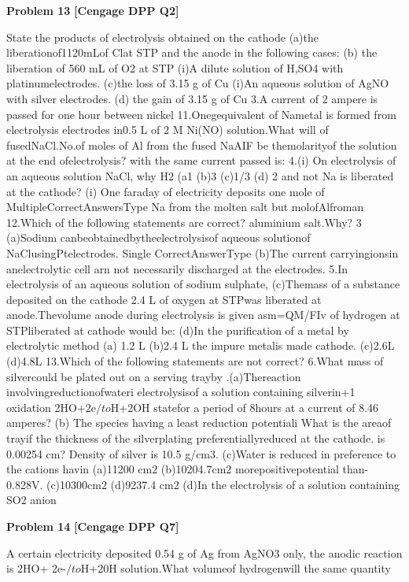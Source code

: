 \begin{problembox}
\textbf{Problem 13} \hfill \textbf{[Cengage DPP Q2]}
\label{q:ext-cng_dpp_all_questions-13}

State the products of electrolysis obtained on the cathode
(a)the liberationof1120mLof Clat STP
and the anode in the following cases:
(b) the liberation of 560 mL of O2 at STP
(i)A dilute solution of H,SO4 with platinumelectrodes.
(c)the loss of 3.15 g of Cu
(i)An aqueous solution of AgNO with silver electrodes.
(d) the gain of 3.15 g of Cu
3.A current of 2 ampere is passed for one hour between nickel
11.Onegequivalent of Nametal is formed from electrolysis
electrodes in0.5 L of 2 M Ni(NO) solution.What will
of fusedNaCl.No.of moles of Al from the fused NaAIF
be themolarityof the solution at the end ofelectrolysis?
with the same current passed is:
4.(i) On electrolysis of an aqueous solution NaCl, why H2
(a1
(b)3
(c)1/3
(d) 2
and not Na is liberated at the cathode?
(i) One faraday of electricity deposits one mole of
MultipleCorrectAnswersType
Na from the molten salt but
molofAlfroman
12.Which of the following statements are correct?
aluminium salt.Why?
3
(a)Sodium canbeobtainedbytheelectrolysisof aqueous
solutionof NaClusingPtelectrodes.
Single CorrectAnswerType
(b)The current carryingionsin anelectrolytic cell arn
not necessarily discharged at the electrodes.
5.In electrolysis of an aqueous solution of sodium sulphate,
(c)Themass of a substance deposited on the cathode
2.4 L of oxygen at STPwas liberated at anode.Thevolume
anode during electrolysis is given asm=QM/FIv
of hydrogen at STPliberated at cathode would be:
(d)In the purification of a metal by electrolytic method
(a) 1.2 L
(b)2.4 L
the impure metalis made cathode.
(c)2.6L
(d)4.8L
13.Which of the following statements are not correct?
6.What mass of silvercould be plated out on a serving trayby
.(a)Thereaction involvingreductionofwateri
electrolysisof a solution containing silverin+1 oxidation
2HO+2e$/to$H+2OH
statefor a period of 8hours at a current of 8.46 amperes?
(b) The species having a least reduction potentiali
What is the areaof trayif the thickness of the silverplating
preferentiallyreduced at the cathode.
is 0.00254 cm? Density of silver is 10.5 g/cm3.
(c)Water is reduced in preference to the cations havin
(a)11200 cm$2$
(b)10204.7cm$2$
morepositivepotential than-0.828V.
(c)10300cm$2$
(d)9237.4 cm2
(d)In the electrolysis of a solution containing SO$2$ anion
\end{problembox}

\begin{problembox}
\textbf{Problem 14} \hfill \textbf{[Cengage DPP Q7]}
\label{q:ext-cng_dpp_all_questions-14}

A certain electricity deposited 0.54 g of Ag from AgNO3
only, the anodic reaction is 2HO+ 2e-$/to$H+20H
solution.What volumeof hydrogenwill the same quantity
\end{problembox}

